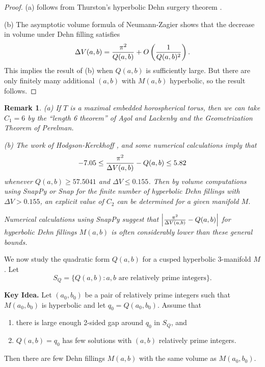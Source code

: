 \documentclass[reqno]{amsproc}  %
\newtheorem{rmk}[prop]{\bf Remark}
\def\ss{\smallskip\noindent}
\begin{document}
\begin{proof}

(a) follows from Thurston's hyperbolic Dehn surgery theorem \cite{Th}. 

(b)  The asymptotic volume formula  of Neumann-Zagier \cite{NZ} shows that the
decrease in volume under Dehn filling satisfies
\begin{equation}  \label{eq5}
\Delta V(a,b) = {\pi^2 \over Q(a,b)} +O\left({1 \over Q(a,b)^2}\right).
\end{equation}
This implies the result of (b) when $Q(a,b)$ is sufficiently large.
But there are only finitely many additional $(a,b)$ with $M(a,b)$ hyperbolic, so the result follows.
\end{proof}

\begin{rmk}
{\em
(a) If $T$ is a maximal embedded
horospherical torus, then we can take $C_1=6$ by the ``length 6 theorem'' of Agol \cite{agol_dehn} and 
Lackenby \cite{lack} and the Geometrization Theorem of Perelman.

(b) The work of Hodgson-Kerckhoff \cite[Theorem 5.12 and Figure 2]{HK}, 
and some numerical calculations  imply  that
\begin{equation}  \label{eq6}
-7.05 \le {\pi^2  \over \Delta V(a,b)} - Q(a,b)  \le 5.82
\end{equation}
whenever $Q(a,b) \ge 57.5041$ and $\Delta V \le 0.155$.
Then by volume computations using SnapPy or Snap for the finite number of hyperbolic Dehn fillings
with $\Delta V > 0.155$, an explicit value of $C_2$ can be determined for a given manifold $M$.

Numerical calculations using SnapPy suggest that 
$\left| {\pi^2  \over \Delta V(a,b)} - Q(a,b)\right|$
for hyperbolic Dehn fillings $M(a,b)$ is often considerably  lower
than these general bounds.}
\end{rmk}

\smallskip
We now study the quadratic form $Q(a,b)$ for a cusped hyperbolic 3-manifold $M$. Let
\begin{equation}  \label{eq7}
S_Q= \{ Q(a,b) : a,b \text{ are relatively prime integers} \}.
\end{equation}

\ss
{\bf Key Idea.} Let  $(a_0,b_0)$ be a pair of relatively prime integers such that
$M(a_0,b_0)$ is hyperbolic and let $q_0 = Q(a_0,b_0)$. Assume that 
\begin{enumerate}
\item[(i)]  there is large enough 2-sided gap around  $q_0$ in $S_Q$, and 
\item[(ii)] $Q(a,b)=q_0$  has few solutions with $(a,b)$ relatively prime integers.
\end{enumerate}
Then there are few Dehn fillings $M(a,b)$ with the same volume as 
$M(a_0,b_0)$.
\end{document}
